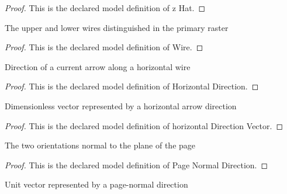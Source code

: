 \begin{proof}
  This is the declared model definition of z Hat.
\end{proof}
\begin{definition}[Wire]
  \label{def:physics:phyx-mini-0960:phyxminiproblems-problemphyxmini0960-wire}
  The upper and lower wires distinguished in the primary raster
\end{definition}
\begin{proof}
  This is the declared model definition of Wire.
\end{proof}
\begin{definition}
  \label{def:physics:phyx-mini-0960:phyxminiproblems-problemphyxmini0960-horizontaldirection}
  Direction of a current arrow along a horizontal wire
\end{definition}
\begin{proof}
  This is the declared model definition of Horizontal Direction.
\end{proof}
\begin{definition}
  \label{def:physics:phyx-mini-0960:phyxminiproblems-problemphyxmini0960-horizontaldirectionvector}
  Dimensionless vector represented by a horizontal arrow direction
\end{definition}
\begin{proof}
  This is the declared model definition of horizontal Direction Vector.
\end{proof}
\begin{definition}
  \label{def:physics:phyx-mini-0960:phyxminiproblems-problemphyxmini0960-pagenormaldirection}
  The two orientations normal to the plane of the page
\end{definition}
\begin{proof}
  This is the declared model definition of Page Normal Direction.
\end{proof}
\begin{definition}
  \label{def:physics:phyx-mini-0960:phyxminiproblems-problemphyxmini0960-pagenormalvector}
  Unit vector represented by a page-normal direction
\end{definition}
